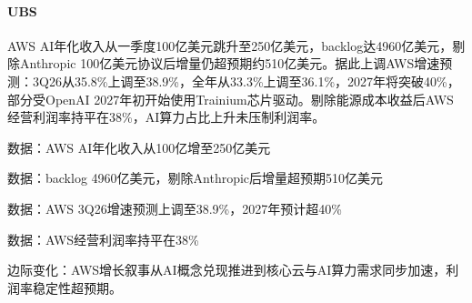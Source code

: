 \documentclass[11pt]{ctexart}
\begin{document}
\paragraph{UBS} AWS AI年化收入从一季度100亿美元跳升至250亿美元，backlog达4960亿美元，剔除Anthropic 100亿美元协议后增量仍超预期约510亿美元。据此上调AWS增速预测：3Q26从35.8\%上调至38.9\%，全年从33.3\%上调至36.1\%，2027年将突破40\%，部分受OpenAI 2027年初开始使用Trainium芯片驱动。剔除能源成本收益后AWS经营利润率持平在38\%，AI算力占比上升未压制利润率。
{\small\color{refgray}数据：AWS AI年化收入从100亿增至250亿美元\par}
{\small\color{refgray}数据：backlog 4960亿美元，剔除Anthropic后增量超预期510亿美元\par}
{\small\color{refgray}数据：AWS 3Q26增速预测上调至38.9\%，2027年预计超40\%\par}
{\small\color{refgray}数据：AWS经营利润率持平在38\%\par}
{\small\color{refgray}边际变化：AWS增长叙事从AI概念兑现推进到核心云与AI算力需求同步加速，利润率稳定性超预期。\par}
\end{document}
